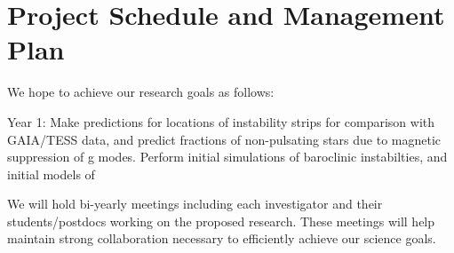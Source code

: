 \section{Project Schedule and Management Plan}

We hope to achieve our research goals as follows:

Year 1: Make predictions for locations of instability strips for comparison with GAIA/TESS data, and predict fractions of non-pulsating stars due to magnetic suppression of g modes. Perform initial simulations of baroclinic instabilties, and initial models of  

We will  hold bi-yearly meetings including each investigator and their students/postdocs working on the proposed research. These meetings will help maintain strong collaboration necessary to efficiently achieve our science goals.
